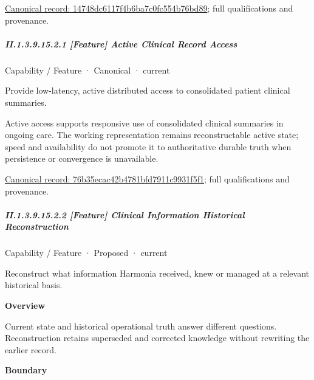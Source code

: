 {\footnotesize \href{../../../../../../../continuum/strategy/capability/14748dc6117f4b6ba7c0fc554b76bd89.md}{Canonical record: 14748dc6117f4b6ba7c0fc554b76bd89}; full qualifications and provenance.}\par
\subparagraph*{II.1.3.9.15.2.1 [Feature] Active Clinical Record Access}
\label{navigation:II.1.3.9.15.2.1}

\label{element:76b35ecac42b4781bfd7911c9931f5f1}
{\small Capability / Feature · Canonical · current}\par

Provide low-latency, active distributed access to consolidated patient clinical summaries.



Active access supports responsive use of consolidated clinical summaries in ongoing care. The working representation remains reconstructable active state; speed and availability do not promote it to authoritative durable truth when persistence or convergence is unavailable.


{\footnotesize \href{../../../../../../../continuum/strategy/capability/feature/76b35ecac42b4781bfd7911c9931f5f1.md}{Canonical record: 76b35ecac42b4781bfd7911c9931f5f1}; full qualifications and provenance.}\par
\subparagraph*{II.1.3.9.15.2.2 [Feature] Clinical Information Historical Reconstruction}
\label{navigation:II.1.3.9.15.2.2}

\label{element:838728ef4fd04b4da0c28dc4fce0cfe9}
{\small Capability / Feature · Proposed · current}\par

Reconstruct what information Harmonia received, knew or managed at a relevant historical basis.



\textbf{Overview}



Current state and historical operational truth answer different questions. Reconstruction retains superseded and corrected knowledge without rewriting the earlier record.



\textbf{Boundary}




